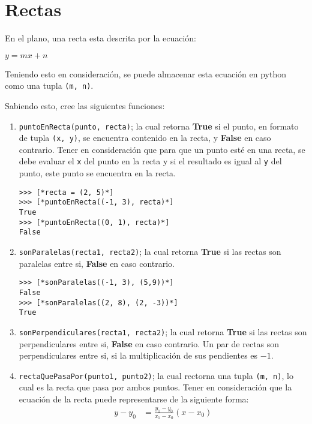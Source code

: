 \section{Rectas}

En el plano, una recta esta descrita por la ecuación:
\begin{center}
	$y = mx + n$
\end{center}

Teniendo esto en consideración, se puede almacenar esta ecuación en python como una tupla \texttt{(m, n)}.

Sabiendo esto, cree las siguientes funciones:

\begin{enumerate}
\item \texttt{puntoEnRecta(punto, recta)}; la cual retorna \textbf{True} si el punto, en formato de tupla \texttt{(x, y)}, se encuentra contenido en la recta, y \textbf{False} en caso contrario. Tener en consideración que para que un punto esté en una recta, se debe evaluar el \texttt{x} del punto en la recta y si el resultado es igual al \texttt{y} del punto, este punto se encuentra en la recta.

\begin{lstlisting}[style=consola]
>>> [*recta = (2, 5)*]
>>> [*puntoEnRecta((-1, 3), recta)*]
True
>>> [*puntoEnRecta((0, 1), recta)*]
False
\end{lstlisting}

\item \texttt{sonParalelas(recta1, recta2)}; la cual retorna \textbf{True} si las rectas son paralelas entre si, \textbf{False} en caso contrario.

\begin{lstlisting}[style=consola]
>>> [*sonParalelas((-1, 3), (5,9))*]
False
>>> [*sonParalelas((2, 8), (2, -3))*]
True
\end{lstlisting}

\item \texttt{sonPerpendiculares(recta1, recta2)}; la cual retorna \textbf{True} si las rectas son perpendiculares entre si, \textbf{False} en caso contrario. Un par de rectas son perpendiculares entre si, si la multiplicación de sus pendientes es $-1$.

\item \texttt{rectaQuePasaPor(punto1, punto2)}; la cual rectorna una tupla \texttt{(m, n)}, lo cual es la recta que pasa por ambos puntos. 
Tener en consideración que la ecuación de la recta puede representarse de la siguiente forma:
\begin{align*}
	y - y_{0} &= \frac{y_{1} - y_{0}}{x_{1} - x_{0}}(x - x_{0}) 
\end{align*} 


\end{enumerate}
